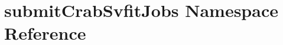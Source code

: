 \hypertarget{namespacesubmitCrabSvfitJobs}{
\section{submitCrabSvfitJobs Namespace Reference}
\label{namespacesubmitCrabSvfitJobs}
}
